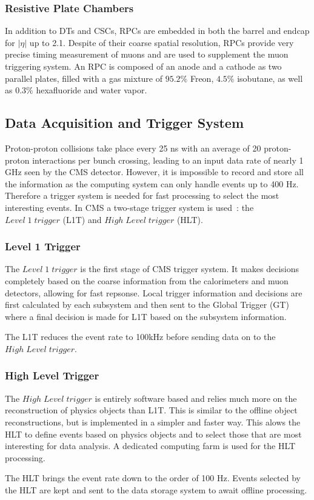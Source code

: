 \subsubsection{Resistive Plate Chambers}
In addition to DTs and CSCs, RPCs are embedded in both the barrel and endcap for $|\eta|$ up to 2.1. Despite of their coarse spatial resolution, RPCs provide very precise timing measurement of muons and are used to supplement the muon triggering system. An RPC is composed of an anode and a cathode as two parallel plates, filled with a gas mixture of $95.2\%$ Freon, $4.5\%$ isobutane, as well as $0.3\%$ hexafluoride and water vapor.

\subsection{Data Acquisition and Trigger System} 
Proton-proton collisions take place every 25 ns with an average of 20 proton-proton interactions per bunch crossing, leading to an input data rate of nearly 1 GHz seen by the CMS detector. However, it is impossible to record and store all the information as the computing system can only handle events up to 400 Hz. Therefore a trigger system is needed for fast processing to select the most interesting events. In CMS a two-stage trigger system is used~\cite{lhc_cmstrigger}: the $Level\; 1\; trigger$ (L1T) and $High\; Level\; trigger$ (HLT).

\subsubsection{Level 1 Trigger}
The $Level\; 1\; trigger$ is the first stage of CMS trigger system. It makes decisions completely based on the coarse information from the calorimeters and muon detectors, allowing for fast repsonse. Local trigger information and decisions are first calculated by each subsystem and then sent to the Global Trigger (GT) where a final decision is made for L1T based on the subsystem information.

\vspace{0.3cm}
The L1T reduces the event rate to 100kHz before sending data on to the $High\; Level\; trigger$.

\subsubsection{High Level Trigger}
The $High\; Level\; trigger$ is entirely software based and relies much more on the reconstruction of physics objects than L1T. This is similar to the offline object reconstructions, but is implemented in a simpler and faster way. This alows the HLT to define events based on physics objects and to select those that are most interesting for data analysis. A dedicated computing farm is used for the HLT processing.

\vspace{0.3cm}
The HLT brings the event rate down to the order of 100 Hz. Events selected by the HLT are kept and sent to the data storage system to await offline processing.

